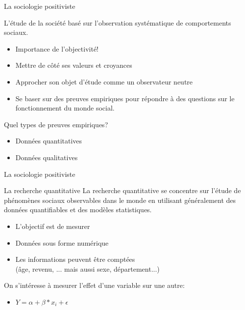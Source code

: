 \documentclass[10pt]{beamer}
\begin{document}
\begin{frame}{La sociologie positiviste}

    L'étude de la société basé sur l'observation systématique de comportements sociaux.
    \begin{itemize}
        \item Importance de l'objectivité!
        \item Mettre de côté ses valeurs et croyances
        \item Approcher son objet d'étude comme un observateur neutre
        \item Se baser sur des preuves empiriques pour répondre à des questions sur le fonctionnement du monde social.
    \end{itemize}

    \begin{block}{Quel types de preuves empiriques?}
    \begin{itemize}
        \item Données quantitatives
        \item Données qualitatives
    \end{itemize}
    \end{block}
\end{frame}

\begin{frame}{La sociologie positiviste}
    \begin{block}{La recherche quantitative}
        La recherche quantitative se concentre sur l'étude de phénomènes sociaux observables dans le monde en utilisant généralement des données quantifiables et des modèles statistiques.
    \begin{itemize}
        \item L'objectif est de mesurer
        \item Données sous forme numérique
        \item Les informations peuvent être comptées \\(âge, revenu, ... mais aussi sexe, département...)
    \end{itemize}
    \end{block}

    On s'intéresse à mesurer l'effet d'une variable sur une autre:
    \begin{itemize}
        \item $Y = \alpha + \beta*x_i + \epsilon$
    \end{itemize}
\end{frame}
\end{document}
